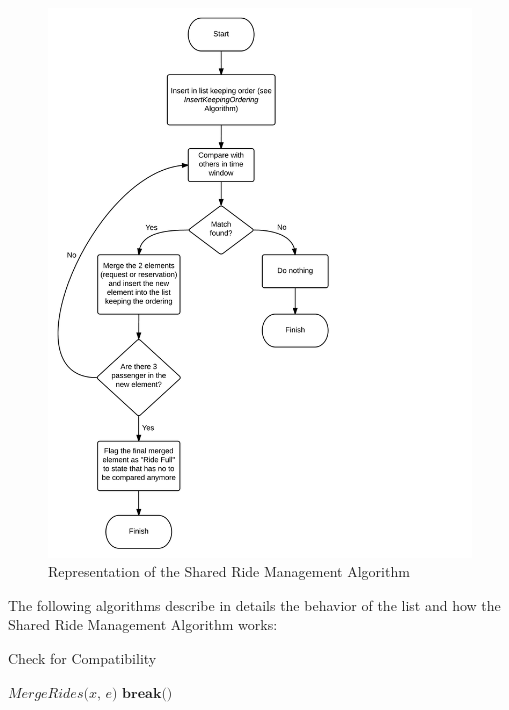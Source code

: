 \begin{figure}[htbp]
\centering
\includegraphics[width=\textwidth]{cpt/img/GenericAlgorithm}
\caption{Representation of the Shared Ride Management Algorithm}
\label{fig:genalg}
\end{figure}
\clearpage

The following algorithms describe in details the behavior of the list and how the Shared Ride Management Algorithm works:

\begin{algorithm}[H]
\caption{Check for Compatibility}
\begin{algorithmic}[1]
		\State $\textit{MergeRides(x, e)}$
		\State ${\textbf{break()}}$
	\EndIf
\EndFor
\EndProcedure
\end{algorithmic}
\end{algorithm}

